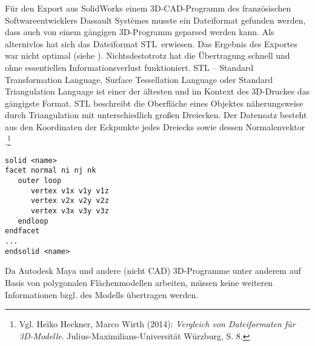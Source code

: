 Für den Export aus SolidWorks einem 3D-CAD-Programm des französischen Softwareentwicklers Dassault Systèmes musste ein Dateiformat gefunden werden, dass auch von einem gängigen 3D-Programm geparsed werden kann. Als alternivlos hat sich das Dateiformat \glqq STL\grqq\, erwiesen. Das Ergebnis des Exportes war nicht optimal (siehe ). Nichtsdestotrotz hat die Übertragung schnell und ohne essentiellen Informationsverlust funktioniert.
STL -- Standard Transformation Language,  Surface Tessellation Language oder Standard Triangulation Language ist einer der ältesten und im Kontext des 3D-Druckes das gängigste Format.  
STL beschreibt die Oberfläche eines Objektes näherungsweise durch Triangulation mit unterschiedlich großen Dreiecken. Der Datensatz besteht aus den Koordinaten der Eckpunkte jedes Dreiecks sowie dessen Normalenvektor .\footnote{Vgl. Heiko Heckner, Marco Wirth (2014): \textit{Vergleich von Dateiformaten für 3D-Modelle}. Julius-Maximilians-Universität Würzburg, S. 8.}


\begin{lstlisting}[caption={STL ASCII Schema.}, captionpos=b, label={lst:STL ASCII}]
solid <name>
facet normal ni nj nk
   outer loop
      vertex v1x v1y v1z
      vertex v2x v2y v2z
      vertex v3x v3y v3z
   endloop
endfacet
...
endsolid <name>

\end{lstlisting}

Da Autodesk Maya und andere (nicht CAD) 3D-Programme unter anderem auf Basis von polygonalen Flächenmodellen arbeiten, müssen keine weiteren Informationen bzgl. des Modells übertragen werden.